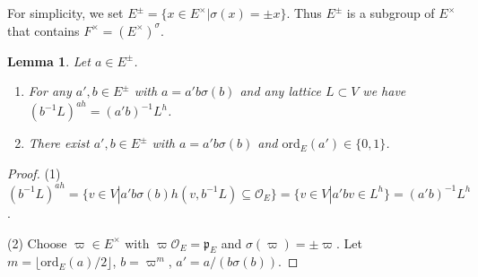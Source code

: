 \documentclass{article}
\def\mf#1{\mathfrak{#1}}
\def\tx#1{\textrm{#1}}
\def\cO{\mathcal{O}}
\newtheorem{lem}[thm]{Lemma}
\theoremstyle{definition}
\numberwithin{equation}{subsection}
\renewcommand{\-}{\hyp{}}
\begin{document}
For simplicity, we set $E^\pm=\{x \in E^\times|\sigma(x)=\pm x\}$. Thus $E^\pm$ is a subgroup of $E^\times$ that contains $F^\times=(E^\times)^\sigma$.




\begin{lem} \label{lem:ssprep}
	Let $a \in E^\pm$.
	\begin{enumerate}
		\item For any $a',b \in E^\pm$ with $a=a'b\sigma(b)$ and any lattice $L \subset V$ we have  $(b^{-1}L)^{ah}=(a'b)^{-1}L^h$.
		\item There exist $a',b \in E^\pm$ with $a=a'b\sigma(b)$ and $\tx{ord}_E(a') \in \{0,1\}$.
	\end{enumerate}
\end{lem}
\begin{proof}
	(1) $(b^{-1}L)^{ah}=\{v \in V|a'b\sigma(b)h(v,b^{-1}L) \subseteq \cO_E\} = \{v \in V|a'bv \in L^h \} = (a'b)^{-1}L^h$.

	(2) Choose $\varpi \in E^\times$ with $\varpi \cO_E=\mf{p}_E$ and $\sigma(\varpi)=\pm\varpi$. Let $m=\lfloor \tx{ord}_E(a)/2 \rfloor$, $b=\varpi^m$, $a'=a/(b\sigma(b))$.
\end{proof}
\end{document}
